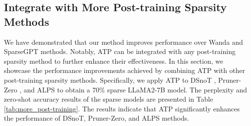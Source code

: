 \subsection{Integrate with More Post-training Sparsity Methods}\label{sec:more_post-training}
We have demonstrated that our method improves performance over Wanda and SparseGPT methods. Notably, ATP can be integrated with any post-training sparsity method to further enhance their effectiveness. In this section, we showcase the performance improvements achieved by combining ATP with other post-training sparsity methods. Specifically, we apply ATP to DSnoT \citep{zhang2023dynamic}, Pruner-Zero \citep{dong2024pruner}, and ALPS \citep{meng2024alps} to obtain a 70$\%$ sparse LLaMA2-7B model. The perplexity and zero-shot accuracy results of the sparse models are presented in Table \ref{tab:more_post-training}. The results indicate that ATP significantly enhances the performance of DSnoT, Pruner-Zero, and ALPS methods.
\begin{table}[h!]
    \centering
    \caption{The performance improvement of ATP on DSnoT, Pruner-zero and ALPS methods.}\label{tab:more_post-training}
\end{table}

